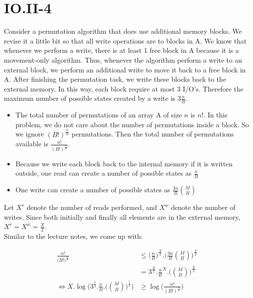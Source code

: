 \section*{IO.II-4}
Consider a permutation algorithm that does use additional memory blocks. We revise it a little bit so that all write operations are 
to blocks in A. We know that whenever we perform a write, there is at least 1 free block in A because it is a movement-only 
algorithm. Thus, whenever the algorithm perform a write to an external block, we perform an additional write to move it back to a
free block in A. After finishing the permutation task, we write these blocks back to the external memory. In this way, each block require at most 3 I/O's. Therefore the maximum number of possible states created by a write is $3\frac{n}{B} $. \\

\begin{itemize} 
  \item The total number of permutations of an array A of size $n$ is $n!$. In this problem, we do not care about the number of 
permutations inside a block. So we ignore $(B!)^{\frac{n}{B} }$ permutations. Then the total number of permutations available is 
$\frac{n!}{(B!)^{\frac{n}{B} }}$.
\item Because we write each block back to the internal memory if it is written outside, one read can create a number of possible states as $\frac{n}{B} $
\item One write can create a number of possible states as $\frac{3n}{B} \binom MB$
\end{itemize}

Let $X^r$ denote the number of reads performed, and $X^w$ denote the number of writes. Since both initially and finally all elements are in the external memory, $X^r = X^w = \frac{X}{2}$. \\ 

Similar to the lecture notes, we come up with:

\begin{equation*}
  \begin{aligned}
  \frac{n!}{\big(B!\big)^{\frac{n}{B}}} &\leq \bigg(\frac{n}{B} \bigg)^{\frac{X}{2}} . \bigg(\frac{3n}{B} \binom MB\bigg)^{\frac{X}{2}} \\
  &= 3^{\frac{X}{2}}.\frac{n}{B}^X.\bigg(\binom MB\bigg)^{\frac{X}{2}} \\
  \iff X.\log \bigg(3^\frac{1}{2}.\frac{n}{B}.\bigg(\binom MB\bigg)^\frac{1}{2} \bigg) &\geq \log \bigg(\frac{n!}{(B!)^{\frac{n}{B}}}\bigg)
\end{aligned}
\end{equation*}

